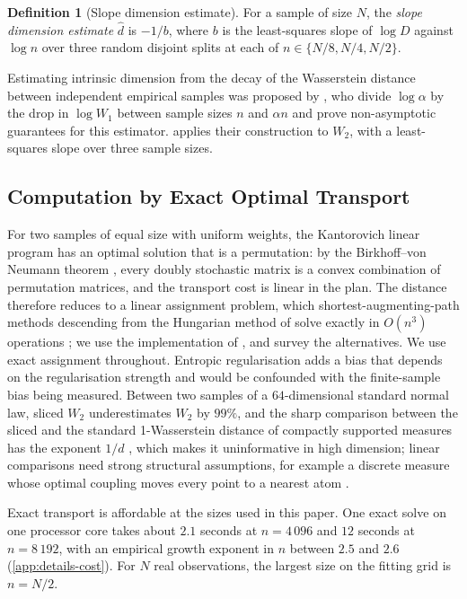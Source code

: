 \documentclass[twoside,11pt]{article}
\theoremstyle{plain}
\theoremstyle{definition}
\newtheorem{defn}{Definition}
\theoremstyle{remark}
\newcommand{\Wtwo}{\ensuremath{W_2}}
\newcommand{\dhat}{\ensuremath{\hat{d}}}
\begin{document}
\begin{defn}[Slope dimension estimate]\label{def:dhat}
For a sample of size $N$, the \emph{slope dimension estimate} $\dhat$ is
$-1/b$, where $b$ is the least-squares slope of $\log D$ against $\log n$
over three random disjoint splits at each of $n \in \{N/8, N/4, N/2\}$.
\end{defn}

Estimating intrinsic dimension from the decay of the Wasserstein distance
between independent empirical samples was proposed by \citet{block2022},
who divide $\log\alpha$ by the drop in $\log W_1$ between sample sizes
$n$ and $\alpha n$ and prove non-asymptotic guarantees for this estimator.
 applies their construction to $\Wtwo$, with a
least-squares slope over three sample sizes.

\subsection{Computation by Exact Optimal Transport}\label{sec:floor-ot}

For two samples of equal size with uniform weights, the Kantorovich linear program \citep{kantorovich1942} has an optimal
solution that is a permutation: by the Birkhoff--von Neumann theorem
\citep{birkhoff1946,vonneumann1953}, every doubly stochastic
matrix is a convex combination of permutation matrices, and the transport
cost is linear in the plan. The distance therefore reduces to a linear
assignment problem, which shortest-augmenting-path methods descending from the Hungarian
method of \citet{kuhn1955} solve exactly in $O(n^3)$ operations
\citep{jonker1987}; we use the implementation of \citet{crouse2016}, and
\citet{peyre2019} survey the alternatives. We use exact assignment throughout.
Entropic regularisation \citep{cuturi2013} adds a bias that depends on the
regularisation strength and would be confounded with the finite-sample bias
being measured. Between two samples of a $64$-dimensional standard normal
law, sliced $\Wtwo$ underestimates $\Wtwo$ by $99\%$, and the sharp
comparison between the sliced and the standard
1-Wasserstein distance of compactly supported measures has the exponent
$1/d$ \citep{carlier2025}, which makes it uninformative in high dimension;
linear comparisons need strong structural assumptions, for example a
discrete measure whose optimal coupling moves every point to a nearest
atom \citep{nilesweed2026}.

Exact transport is affordable at the sizes used in this paper. One exact
solve on one processor core takes about $2.1$ seconds at $n = 4\,096$ and
$12$ seconds at $n = 8\,192$, with an empirical growth exponent in $n$
between $2.5$ and $2.6$ (\cref{app:details-cost}). For $N$ real
observations, the largest size on the fitting grid is $n = N/2$.
\end{document}
